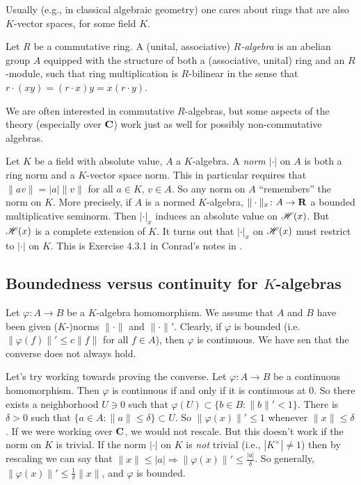 
Usually (e.g., in classical algebraic geometry) one cares about rings that are 
also $K$-vector spaces, for some field $K$. 

\begin{definition}
Let $R$ be a commutative ring. A (unital, associative) \emph{$R$-algebra} is an 
abelian group $A$ equipped with the structure of both a (associative, unital) 
ring and an $R$-module, such that ring multiplication is $R$-bilinear in the 
sense that $r\cdot(x y) = (r\cdot x) y = x(r\cdot y)$. 
\end{definition}

We are often interested in commutative $R$-algebras, but some aspects of the 
theory (especially over $\mathbf{C}$) work just as well for possibly non-commutative 
algebras. 

Let $K$ be a field with absolute value, $A$ a $K$-algebra. A \emph{norm} 
$|\cdot|$ on $A$ is both a ring norm and a $K$-vector space norm. This in 
particular requires that $\|a v\| = |a| \| v\|$ for all $a\in K$, $v\in A$. 
So any norm on $A$ ``remembers'' the norm on $K$. More precisely, if $A$ is a 
normed $K$-algebra, $\|\cdot\|_x\colon A\to \mathbf{R}$ a bounded multiplicative 
seminorm. Then $|\cdot|_x$ induces an absolute value on $\mathscr{H}(x)$. But $\mathscr{H}(x)$ 
is a complete extension of $K$. It turns out that $|\cdot|_x$ on $\mathscr{H}(x)$ 
must restrict to $|\cdot|$ on $K$. This is Exercise 4.3.1 in Conrad's notes in 
\cite{aws-2008}.





\subsection{Boundedness versus continuity for \texorpdfstring{$K$}{K}-algebras}

Let $\varphi\colon A\to B$ be a $K$-algebra homomorphism. We assume that 
$A$ and $B$ have been given ($K$-)norms $\|\cdot\|$ and $\|\cdot\|'$. Clearly, 
if $\varphi$ is bounded (i.e.~$\|\varphi(f)\|' \leqslant c\|f\|$ for all 
$f\in A$), then $\varphi$ is continuous. We have sen that the converse does not 
always hold. 

Let's try working towards proving the converse. Let $\varphi\colon A\to B$ be a 
continuous homomorphism. Then $\varphi$ is continuous if and only if it is 
continuous at $0$. So there exists a neighborhood $U\ni 0$ such that 
$\varphi(U)\subset \{b\in B\colon \|b\|'<1\}$. There is $\delta>0$ such that 
$\{a\in A\colon \|a\|\leqslant \delta\}\subset U$. So 
$\|\varphi(x)\|'\leqslant 1$ whenever $\|x\|\leqslant \delta$. If we were 
working over $\mathbf{C}$, we would not rescale. But this doesn't work if the norm on 
$K$ is trivial. If the norm $|\cdot|$ on $K$ is \emph{not} trivial (i.e., 
$|K^\times|\ne 1$) then by rescaling we can say that 
$\|x\|\leqslant |a|\Rightarrow \|\varphi(x)\|' \leqslant \frac{|a|}{\delta}$. 
So generally, $\|\varphi(x)\|' \leqslant \frac{1}{\delta}\|x\|$, and 
$\varphi$ is bounded. 

